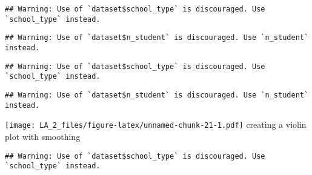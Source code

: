 \documentclass[
]{article}
\newenvironment{Shaded}{\begin{snugshade}}{\end{snugshade}}
\newcommand{\AttributeTok}[1]{\textcolor[rgb]{0.77,0.63,0.00}{#1}}
\newcommand{\ConstantTok}[1]{\textcolor[rgb]{0.00,0.00,0.00}{#1}}
\newcommand{\DecValTok}[1]{\textcolor[rgb]{0.00,0.00,0.81}{#1}}
\newcommand{\FunctionTok}[1]{\textcolor[rgb]{0.00,0.00,0.00}{#1}}
\newcommand{\NormalTok}[1]{#1}
\newcommand{\SpecialCharTok}[1]{\textcolor[rgb]{0.00,0.00,0.00}{#1}}
\newcommand{\StringTok}[1]{\textcolor[rgb]{0.31,0.60,0.02}{#1}}
\begin{document}
\begin{Shaded}
\end{Shaded}

\begin{verbatim}
## Warning: Use of `dataset$school_type` is discouraged. Use `school_type` instead.
\end{verbatim}

\begin{verbatim}
## Warning: Use of `dataset$n_student` is discouraged. Use `n_student` instead.
\end{verbatim}

\begin{verbatim}
## Warning: Use of `dataset$school_type` is discouraged. Use `school_type` instead.
\end{verbatim}

\begin{verbatim}
## Warning: Use of `dataset$n_student` is discouraged. Use `n_student` instead.
\end{verbatim}

\texttt{[image: LA\_2\_files/figure-latex/unnamed-chunk-21-1.pdf]}
creating a violin plot with smoothing

\begin{Shaded}
\end{Shaded}

\begin{verbatim}
## Warning: Use of `dataset$school_type` is discouraged. Use `school_type` instead.
\end{verbatim}
\end{document}
